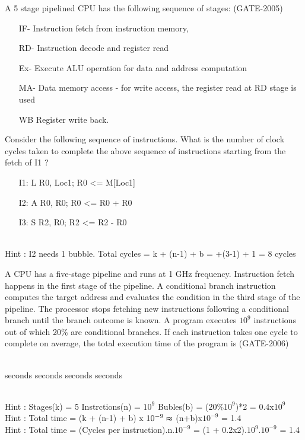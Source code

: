 \begin{questyle}
  \question  A 5 stage pipelined CPU has the following sequence of stages:  (GATE-2005)
  \begin{enumerate}
    \item[IF-] Instruction fetch from instruction memory,
    \item[RD-] Instruction decode and register read
    \item[Ex-] Execute ALU operation for data and address computation
    \item[MA-] Data memory access - for write access, the register read
     at RD stage is used
     \item[WB] Register write back.
  \end{enumerate}
  Consider the following sequence of instructions. What is the number of clock cycles taken to complete the above sequence of instructions starting from the fetch of I1 ?
  \begin{enumerate}
    \item[I1:] \quad L R0, Loc1; \quad R0 \textless= M[Loc1]
    \item[I2:] \quad A R0, R0; \quad \; \; R0 \textless= R0 + R0
    \item[I3:] \quad S R2, R0; \quad \; \; R2 \textless= R2 - R0
  \end{enumerate}

  \begin{oneparchoices}
  \end{oneparchoices} \\
  Hint : I2 needs 1 bubble. Total cycles = \quad k + (n-1) + b =  +(3-1) + 1 = 8 cycles
\end{questyle}

\begin{questyle}
  \question  A CPU has a five-stage pipeline and runs at 1 GHz frequency. Instruction fetch happens
             in the first stage of the pipeline. A conditional branch instruction computes the target
             address and evaluates the condition in the third stage of the pipeline. The processor stops
             fetching new instructions following a conditional branch until the branch outcome is known.
             A program executes \(10^9\) instructions out of which 20\% are conditional branches. If each
             instruction takes one cycle to complete on average, the total execution time of the program is  (GATE-2006)
  \begin{oneparchoices} \\
     seconds
     seconds
     seconds
     seconds
  \end{oneparchoices}\\
  Hint : Stages(k) = 5 \quad Instrctions(n) = \(10^9\) \quad Bubles(b) = (20\%\(10^9\))*2 = 0.4x\(10^9\) \\
  Hint : Total time = \quad (k + (n-1) + b) x \(10^{-9} \thickapprox \) (n+b)x\(10^{-9} \) = 1.4 \\
  Hint : Total time = (Cycles per instruction).n.\(10^{-9}\) = (1 + 0.2x2).\(10^9\).\(10^{-9}\) = 1.4
\end{questyle}

